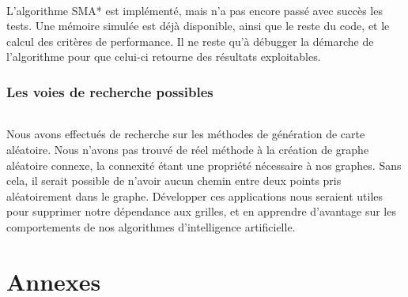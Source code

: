 \documentclass[pidr]{tnreport}
\begin{document}
\paragraph{}
L'algorithme SMA* est implémenté, mais n'a pas encore passé avec succès les tests. Une mémoire simulée est déjà disponible, ainsi que le reste du code, et le calcul des critères de performance. Il ne reste qu'à débugger la démarche de l'algorithme pour que celui-ci retourne des résultats exploitables.  

\section{Les voies de recherche possibles}
\paragraph{}
Nous avons effectués de recherche sur les méthodes de génération de carte aléatoire. Nous n'avons pas trouvé de réel méthode à la création de graphe aléatoire connexe, la connexité étant une propriété nécessaire à nos graphes. Sans cela, il serait possible de n'avoir aucun chemin entre deux points pris aléatoirement dans le graphe. Développer ces applications nous seraient utiles pour supprimer notre dépendance aux grilles, et en apprendre d'avantage sur les comportements de nos algorithmes d'intelligence artificielle.

\clearpage
\renewcommand{\tocbibname}{Bibliographie / Webographie}


\clearpage

\renewcommand{\thesubsection}{\Roman{subsection}}


\appendix
\part*{Annexes}
\end{document}

